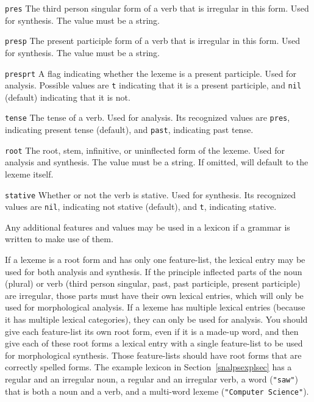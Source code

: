 \documentclass{book}
\begin{document}
\begin{description}
\item{\tt pres} The third person singular form of a verb that is irregular in this form.  Used for
synthesis.  The value must be a string.

\item{\tt presp} The present participle form of a verb that is irregular in this form.  Used for
synthesis.  The value must be a string.

\item{\tt presprt} A flag indicating whether the lexeme is a present participle.  Used for
analysis.  Possible values are {\tt t} indicating that it is a present participle, and
{\tt nil} (default) indicating that it is not.

\item{\tt tense} The tense of a verb.  Used for analysis.  Its recognized values are {\tt pres}, indicating
present tense (default), and {\tt past}, indicating past tense.

\item{\tt root} The root, stem, infinitive, or uninflected form of the lexeme.  Used for analysis
and synthesis.  The value must be a string.  If omitted, will default to the lexeme itself.

\item{\tt stative} Whether or not the verb is stative.  Used for synthesis.  Its recognized values
are {\tt nil}, indicating not stative (default), and {\tt t}, indicating stative.

\end{description}
Any additional features and values may be used in a lexicon if a grammar is written to make use of
them.

If a lexeme is a root form and has only one feature-list, the lexical
entry may be used for both analysis and synthesis.  If the principle
inflected parts of the noun (plural) or verb (third person singular,
past, past participle, present participle) are irregular, those parts
must have their own lexical entries, which will only be used for
morphological analysis.  If a lexeme has multiple lexical entries
(because it has multiple lexical categories), they can only be used
for analysis.  You should give each feature-list its own root form,
even if it is a made-up word, and then give each of these root forms a
lexical entry with a single feature-list to be used for morphological
synthesis.  Those feature-lists should have root forms that are
correctly spelled forms.  The example lexicon in
Section~\ref{snalpsexplsec} has a regular and an irregular noun, a
regular and an irregular verb, a word ({\tt "saw"}) that is both a
noun and a verb, and a multi-word lexeme ({\tt "Computer Science"}).
\end{document}
